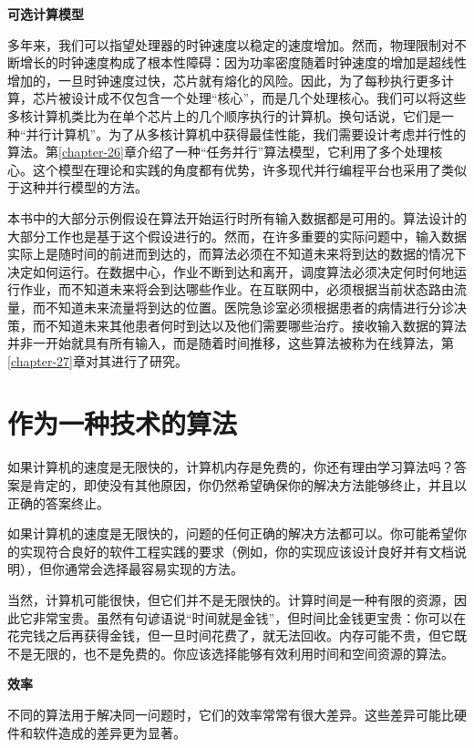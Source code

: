 \documentclass[lang=cn,newtx,10pt,scheme=chinese]{elegantbook}
\begin{document}
\textbf{可选计算模型}

多年来，我们可以指望处理器的时钟速度以稳定的速度增加。然而，物理限制对不断增长的时钟速度构成了根本性障碍：因为功率密度随着时钟速度的增加是超线性增加的，一旦时钟速度过快，芯片就有熔化的风险。因此，为了每秒执行更多计算，芯片被设计成不仅包含一个处理``核心''，而是几个处理核心。我们可以将这些多核计算机类比为在单个芯片上的几个顺序执行的计算机。换句话说，它们是一种``并行计算机''。为了从多核计算机中获得最佳性能，我们需要设计考虑并行性的算法。第\ref{chapter-26}章介绍了一种``任务并行''算法模型，它利用了多个处理核心。这个模型在理论和实践的角度都有优势，许多现代并行编程平台也采用了类似于这种并行模型的方法。

本书中的大部分示例假设在算法开始运行时所有输入数据都是可用的。算法设计的大部分工作也是基于这个假设进行的。然而，在许多重要的实际问题中，输入数据实际上是随时间的前进而到达的，而算法必须在不知道未来将到达的数据的情况下决定如何运行。在数据中心，作业不断到达和离开，调度算法必须决定何时何地运行作业，而不知道未来将会到达哪些作业。在互联网中，必须根据当前状态路由流量，而不知道未来流量将到达的位置。医院急诊室必须根据患者的病情进行分诊决策，而不知道未来其他患者何时到达以及他们需要哪些治疗。接收输入数据的算法并非一开始就具有所有输入，而是随着时间推移，这些算法被称为在线算法，第\ref{chapter-27}章对其进行了研究。

\section{作为一种技术的算法}\label{section-1.2}

如果计算机的速度是无限快的，计算机内存是免费的，你还有理由学习算法吗？答案是肯定的，即使没有其他原因，你仍然希望确保你的解决方法能够终止，并且以正确的答案终止。

如果计算机的速度是无限快的，问题的任何正确的解决方法都可以。你可能希望你的实现符合良好的软件工程实践的要求（例如，你的实现应该设计良好并有文档说明），但你通常会选择最容易实现的方法。

当然，计算机可能很快，但它们并不是无限快的。计算时间是一种有限的资源，因此它非常宝贵。虽然有句谚语说``时间就是金钱''，但时间比金钱更宝贵：你可以在花完钱之后再获得金钱，但一旦时间花费了，就无法回收。内存可能不贵，但它既不是无限的，也不是免费的。你应该选择能够有效利用时间和空间资源的算法。

\textbf{效率}

不同的算法用于解决同一问题时，它们的效率常常有很大差异。这些差异可能比硬件和软件造成的差异更为显著。
\end{document}
